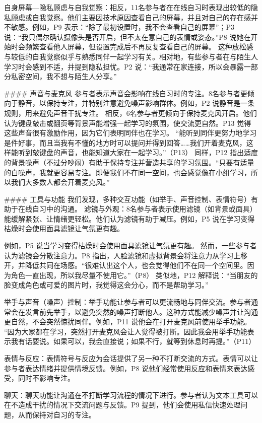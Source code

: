 \documentclass[12pt]{ctexart}
\begin{document}
自身屏幕—隐私顾虑与自我觉察：相反，11名参与者在在线自习时表现出较低的隐私顾虑或自我觉察。他们主要因技术原因查看自己的屏幕，并且对自己的存在感并不敏感。例如，P9 表示：“除了最初设置时，我不会查看自己的屏幕”；P3 说：“我只偶尔确认摄像头是否开启，但不太在意自己的表情或姿态。”P8 说她在开始时会频繁查看他人屏幕，但设置完成后不再反复查看自己的屏幕。
这种放松感与较低的自我觉察似乎与熟悉同伴一起学习有关。相对地，有些参与者在与陌生人学习时会感到不适，并提到隐私担忧。P2 说：“我通常在家连接，所以会暴露一部分私密空间，我不想与陌生人分享。”

\#\#\#\# 声音与麦克风
参与者表示声音会影响在线自习时的专注。8名参与者更倾向于静音，以保持专注，并特别注意避免噪声影响群体。例如，P2 说静音是一条规则，用来避免声音干扰专注。
相反，6名参与者更倾向于保持麦克风开启。他们认为键盘敲击或翻页等背景声能增强一起学习的氛围，使交流更自然。P13 觉得这些声音很有激励作用，因为它们表明同伴也在学习。
“能听到同伴更努力地学习是件好事，而且当我有不懂的地方时可以提问并得到回答……我们开着麦克风，这样能听到敲键盘的声音，也能知道大家在一起学习。”（P13）
同样，P12 指出适度的背景噪声（不过分吵闹）有助于保持专注并营造共享的学习氛围。“只要有适量的白噪声，我就更容易专注。即便我们不在同一空间，也会感觉像在小组学习，所以我们大多数人都会开着麦克风。”

\#\#\#\# 工具与功能
我们发现，多种交互功能（如举手、声音控制、表情符号）有助于在线自习中的沟通。
滤镜与外观：8名参与者表示使用滤镜（如背景或面具）能缓解紧张、让情绪更轻松。他们认为滤镜有助于减压。例如，P5 说在学习变得枯燥时会使用面具滤镜让气氛更有趣。

例如，P5 说当学习变得枯燥时会使用面具滤镜让气氛更有趣。
然而，一些参与者认为滤镜会分散注意力。P8 指出，人脸滤镜和虚拟背景会将注意力从学习上移开，并降低共同在场感。“很难认出这个人，也会觉得他们不在同一个空间里。因为角色一直出现，所以我尽量不使用它。”（P8）
类似地，P12 解释说：“当朋友的脸变成角色或可爱的图片时，我觉得这会分心，而不是帮助学习。”

举手与声音（噪声）控制：举手功能让参与者可以更流畅地与同伴交流。参与者通常会在发言前先举手，以避免突然的噪声打断他人。这种方式能减少噪声并让沟通更自然，不会突然惊扰同伴。例如，P11 说他会在打开麦克风前使用举手功能。
“因为大家都在学习，突然打开麦克风会让人觉得被打断。因此我会用举手功能表示我有话要说。如果可以，我会直接说；如果不行，就等到休息时再提。”（P11）

表情与反应：表情符号与反应为会话提供了另一种不打断交流的方式。表情可以让参与者表达情绪并提供情境反馈。例如，P8 说他们经常使用反应和表情来表达感受，同时不影响专注。

聊天：聊天功能让沟通在不打断学习流程的情况下进行。参与者认为文本工具可以在不造成干扰的情况下交流问题与反馈。P9 提到，他们会使用私信快速处理问题，从而保持对自习的专注。
\end{document}
